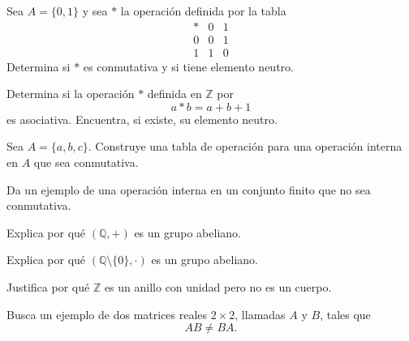 \begin{ejerciciospropuestos}
  \item Sea \(A=\{0,1\}\) y sea \(*\) la operación definida por la tabla
  \[
  \begin{array}{c|cc}
    * & 0 & 1 \\
    \hline
    0 & 0 & 1 \\
    1 & 1 & 0
  \end{array}
  \]
  Determina si \(*\) es conmutativa y si tiene elemento neutro.

  \item Determina si la operación \(*\) definida en \(\mathbb{Z}\) por
  \[
    a*b=a+b+1
  \]
  es asociativa. Encuentra, si existe, su elemento neutro.

  \item Sea \(A=\{a,b,c\}\). Construye una tabla de operación para una operación interna en \(A\) que sea conmutativa.

  \item Da un ejemplo de una operación interna en un conjunto finito que no sea conmutativa.

  \item Explica por qué \((\mathbb{Q},+)\) es un grupo abeliano.

  \item Explica por qué \((\mathbb{Q}\setminus\{0\},\cdot)\) es un grupo abeliano.

  \item Justifica por qué \(\mathbb{Z}\) es un anillo con unidad pero no es un cuerpo.

  \item Busca un ejemplo de dos matrices reales \(2\times 2\), llamadas \(A\) y \(B\), tales que
  \[
    AB\neq BA.
  \]
\end{ejerciciospropuestos}

